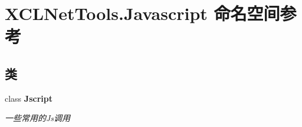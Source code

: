 \hypertarget{namespace_x_c_l_net_tools_1_1_javascript}{}\section{X\+C\+L\+Net\+Tools.\+Javascript 命名空间参考}
\label{namespace_x_c_l_net_tools_1_1_javascript}
\subsection*{类}
\begin{DoxyCompactItemize}
\item 
class {\bfseries Jscript}
\begin{DoxyCompactList}\small\item\em 一些常用的\+Js调用 \end{DoxyCompactList}\end{DoxyCompactItemize}
